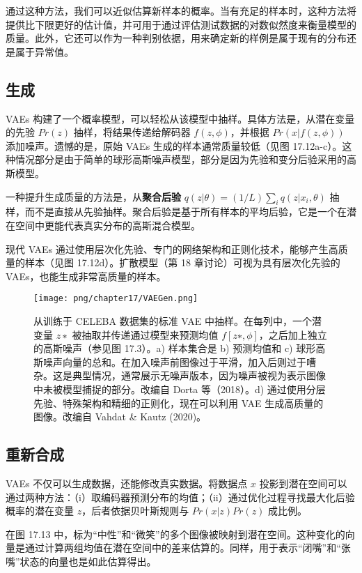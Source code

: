 通过这种方法，我们可以近似估算新样本的概率。当有充足的样本时，这种方法将提供比下限更好的估计值，并可用于通过评估测试数据的对数似然度来衡量模型的质量。此外，它还可以作为一种判别依据，用来确定新的样例是属于现有的分布还是属于异常值。

\subsection{生成}
VAEs 构建了一个概率模型，可以轻松从该模型中抽样。具体方法是，从潜在变量的先验 \(Pr(z)\) 抽样，将结果传递给解码器 \(f(z, \phi)\)，并根据 \(Pr(x|f(z, \phi))\) 添加噪声。遗憾的是，原始 VAEs 生成的样本通常质量较低（见图 17.12a-c）。这种情况部分是由于简单的球形高斯噪声模型，部分是因为先验和变分后验采用的高斯模型。

一种提升生成质量的方法是，从\textbf{聚合后验} \(q(z|\theta) = (1/L) \sum_{i} q(z|x_i, \theta)\) 抽样，而不是直接从先验抽样。聚合后验是基于所有样本的平均后验，它是一个在潜在空间中更能代表真实分布的高斯混合模型。

现代 VAEs 通过使用层次化先验、专门的网络架构和正则化技术，能够产生高质量的样本（见图 17.12d）。扩散模型（第 18 章讨论）可视为具有层次化先验的 VAEs，也能生成非常高质量的样本。

\begin{figure}[ht!]
\centering
\texttt{[image: png/chapter17/VAEGen.png]}
\caption{从训练于 CELEBA 数据集的标准 VAE 中抽样。在每列中，一个潜变量 \(z∗\) 被抽取并传递通过模型来预测均值 \(f[z∗, \phi]\)，之后加上独立的高斯噪声（参见图 17.3）。a) 样本集合是 b) 预测均值和 c) 球形高斯噪声向量的总和。在加入噪声前图像过于平滑，加入后则过于嘈杂。这是典型情况，通常展示无噪声版本，因为噪声被视为表示图像中未被模型捕捉的部分。改编自 Dorta 等（2018）。d) 通过使用分层先验、特殊架构和精细的正则化，现在可以利用 VAE 生成高质量的图像。改编自 Vahdat \& Kautz (2020)。}
\end{figure}


\subsection{重新合成}
VAEs 不仅可以生成数据，还能修改真实数据。将数据点 \(x\) 投影到潜在空间可以通过两种方法：（i）取编码器预测分布的均值；（ii）通过优化过程寻找最大化后验概率的潜在变量 \(z\)，后者依据贝叶斯规则与 \(Pr(x|z)Pr(z)\) 成比例。

在图 17.13 中，标为“中性”和“微笑”的多个图像被映射到潜在空间。这种变化的向量是通过计算两组均值在潜在空间中的差来估算的。同样，用于表示“闭嘴”和“张嘴”状态的向量也是如此估算得出。

